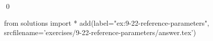 
\begin{ex}
  \label{ex:9-22-reference-parameters}
  
  \qed
\end{ex}
\begin{python0}
from solutions import *
add(label="ex:9-22-reference-parameters",
    srcfilename='exercises/9-22-reference-parameters/answer.tex')
\end{python0}

